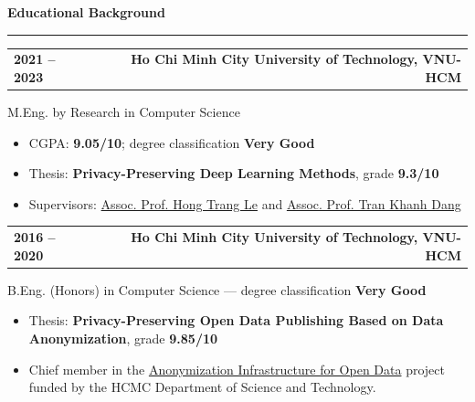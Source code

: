 \documentclass[11pt,a4paper]{article}
\makeatletter
\newcommand{\sectiontitle}[1]{%
  \Needspace{5\baselineskip}
  \vspace{0.28cm}%
  {\Large\bfseries #1}\par\vspace{0.08cm}\hrule\vspace{0.18cm}%
}
\newcommand{\headerline}[2]{%
  \noindent\begin{tabular*}{\textwidth}{@{}l@{\extracolsep{\fill}}r@{}}
  #1 & #2
  \end{tabular*}\par
}
\newcommand{\entry}[4]{%
  \vspace{0.16cm}
  \headerline{\textbf{#1}}{\textbf{#2}}
  {#3}\par
  #4
}
\makeatother
\begin{document}
\sectiontitle{Educational Background}
\entry{2021 -- 2023}{Ho Chi Minh City University of Technology, VNU-HCM}
{M.Eng. by Research in Computer Science}
{\begin{itemize}
  \item CGPA: \textbf{9.05/10}; degree classification \textbf{Very Good}
  \item Thesis: \textbf{Privacy-Preserving Deep Learning Methods}, grade \textbf{9.3/10}
  \item Supervisors: \href{https://scholar.google.com/citations?hl=en&user=3hnmhI4AAAAJ}{Assoc. Prof. Hong Trang Le} and \href{https://scholar.google.com/citations?hl=vi&user=VsxZa7sAAAAJ}{Assoc. Prof. Tran Khanh Dang}
\end{itemize}}

\entry{2016 -- 2020}{Ho Chi Minh City University of Technology, VNU-HCM}
{B.Eng. (Honors) in Computer Science --- degree classification \textbf{Very Good}}
{\begin{itemize}
  \item Thesis: \textbf{Privacy-Preserving Open Data Publishing Based on Data Anonymization}, grade \textbf{9.85/10}
  \item Chief member in the \href{https://sti.vista.gov.vn/projects/kqnv/ky-thuat-an-danh-bao-ve-tinh-rieng-tu-cho-du-lieu-mo-125329.html}{Anonymization Infrastructure for Open Data} project funded by the HCMC Department of Science and Technology.
\end{itemize}}
\end{document}
